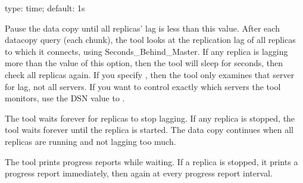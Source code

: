 \documentclass[letterpaper,10pt,english]{sphinxmanual}
\begin{document}

\begin{fulllineitems}
\label{\detokenize{mariadb-schema-change:cmdoption-mariadb-schema-change-max-lag}}
\sphinxAtStartPar
type: time; default: 1s

\sphinxAtStartPar
Pause the data copy until all replicas’ lag is less than this value.  After each
data\sphinxhyphen{}copy query (each chunk), the tool looks at the replication lag of
all replicas to which it connects, using Seconds\_Behind\_Master. If any replica
is lagging more than the value of this option, then the tool will sleep
for {\hyperref[\detokenize{mariadb-schema-change:cmdoption-mariadb-schema-change-check-interval}]{}} seconds, then check all replicas again.  If you
specify {\hyperref[\detokenize{mariadb-schema-change:cmdoption-mariadb-schema-change-check-slave-lag}]{}}, then the tool only examines that server for
lag, not all servers.  If you want to control exactly which servers the tool
monitors, use the DSN value to {\hyperref[\detokenize{mariadb-schema-change:cmdoption-mariadb-schema-change-recursion-method}]{}}.

\sphinxAtStartPar
The tool waits forever for replicas to stop lagging.  If any replica is
stopped, the tool waits forever until the replica is started.  The data copy
continues when all replicas are running and not lagging too much.

\sphinxAtStartPar
The tool prints progress reports while waiting.  If a replica is stopped, it
prints a progress report immediately, then again at every progress report
interval.

\end{fulllineitems}
\end{document}
